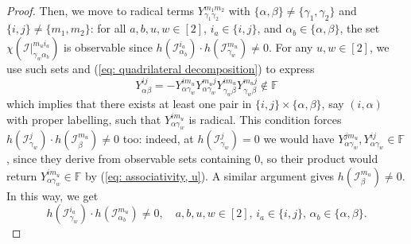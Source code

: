 \documentclass[10pt]{article}
\theoremstyle{remark}%
\theoremstyle{definition}%
\begin{document}
\begin{proof}
Then, we move to radical terms $Y_{\gamma_{1}\gamma_{2}}^{m_{1}m_{2}}$ with $\{\alpha,\beta\}\neq\{\gamma_{1},\gamma_{2}\}$ and $\{i,j\}\neq\{m_{1},m_{2}\}$: for all $a,b,u,w\in[2]$, $i_{a}\in\{i,j\}$, and $\alpha_{b}\in\{\alpha,\beta\}$, the set $\chi(\mathcal{I}|_{\gamma_{w}\alpha_{b}}^{m_{u}i_{a}})$ is observable since $h(\mathcal{I}_{\alpha_{b}}^{i_{a}})\cdot h(\mathcal{I}_{\gamma_{w}}^{m_{u}})\neq0$. For any $u,w\in[2]$, we use such sets and (\ref{eq: quadrilateral decomposition}) to express  
\begin{equation} 
Y_{\alpha\beta}^{ij}=-Y_{\alpha\gamma_{w}}^{im_{u}}Y_{\alpha\gamma_{w}}^{m_{u}j}Y_{\gamma_{w}\beta}^{im_{u}}Y_{\gamma_{w}\beta}^{m_{u}j}\notin\mathbb{F}
\end{equation} 
which implies that there exists at least one pair in $\{i,j\}\times\{\alpha,\beta\}$, say $(i,\alpha)$ with proper labelling, such that $Y_{\alpha\gamma_{w}}^{im_{u}}$ is radical. This condition forces $h(\mathcal{I}_{\gamma_{w}}^{j})\cdot h(\mathcal{I}_{\beta}^{m_{u}})\neq0$ too: indeed, at $h(\mathcal{I}_{\gamma_{w}}^{j})=0$ we would have $Y_{\alpha\gamma_{w}}^{jm_{u}},Y_{\alpha\gamma_{w}}^{ij}\in\mathbb{F}$, since they derive from observable sets containing $0$, so their product would return $Y_{\alpha\gamma_{w}}^{im_{u}}\in\mathbb{F}$ by (\ref{eq: associativity, u}). A similar argument gives $h(\mathcal{I}_{\beta}^{m_{u}})\neq0$. In this way, we get 
\begin{equation}
h(\mathcal{I}_{\gamma_{w}}^{i_{a}})\cdot h(\mathcal{I}_{\alpha_{b}}^{m_{u}})\neq0,
\quad a,b,u,w\in[2],\,i_{a}\in\{i,j\},\,\alpha_{b}\in\{\alpha,\beta\}.
\label{eq: non-central non-vanishing}
\end{equation}


\end{proof}
\end{document}
